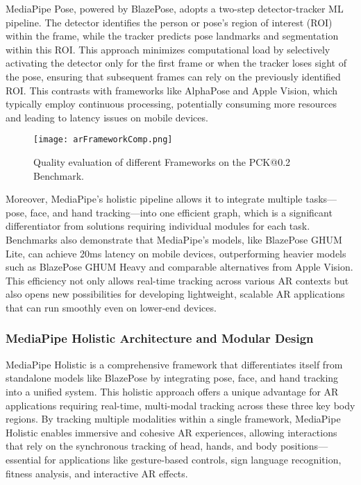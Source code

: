 MediaPipe Pose, powered by BlazePose\cite{bazarevsky2020blazepose}, adopts a two-step detector-tracker ML pipeline. The detector identifies the person or pose’s region of interest (ROI) within the frame, while the tracker predicts pose landmarks and segmentation within this ROI. This approach minimizes computational load by selectively activating the detector only for the first frame or when the tracker loses sight of the pose, ensuring that subsequent frames can rely on the previously identified ROI.
This contrasts with frameworks like AlphaPose and Apple Vision, which typically employ continuous processing, potentially consuming more resources and leading to latency issues on mobile devices.
\begin{figure}[!h]
    \centering
    \texttt{[image: arFrameworkComp.png]}
    \caption{Quality evaluation of different Frameworks on the PCK@0.2 Benchmark.}
    \vspace{0.1cm}
    \label{fig:arFrameworks}
\end{figure}
Moreover, MediaPipe’s holistic pipeline allows it to integrate multiple tasks—pose, face, and hand tracking—into one efficient graph, which is a significant differentiator from solutions requiring individual modules for each task.
Benchmarks also demonstrate that MediaPipe’s models, like BlazePose GHUM Lite, can achieve 20ms latency on mobile devices, outperforming heavier models such as BlazePose GHUM Heavy and comparable alternatives from Apple Vision.
This efficiency not only allows real-time tracking across various AR contexts but also opens new possibilities for developing lightweight, scalable AR applications that can run smoothly even on lower-end devices.

\subsubsection{MediaPipe Holistic Architecture and Modular Design}

MediaPipe Holistic is a comprehensive framework that differentiates itself from standalone models like BlazePose by integrating pose, face, and hand tracking into a unified system.
This holistic approach offers a unique advantage for AR applications requiring real-time, multi-modal tracking across these three key body regions.
By tracking multiple modalities within a single framework, MediaPipe Holistic enables immersive and cohesive AR experiences, allowing interactions that rely on the synchronous tracking of head, hands, and body positions—essential for applications like gesture-based controls, sign language recognition, fitness analysis, and interactive AR effects.

